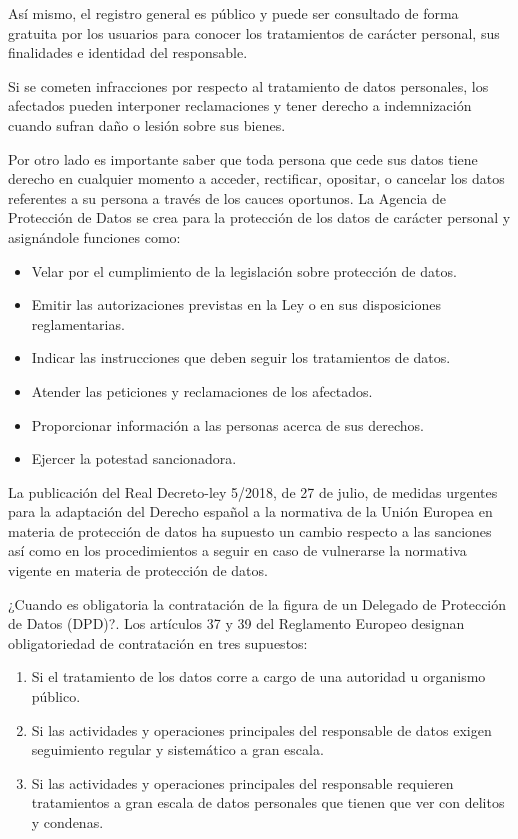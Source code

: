 	\newp Así mismo, el registro general es público y puede ser consultado de forma gratuita por los usuarios para conocer los tratamientos de carácter personal, sus finalidades e identidad del responsable.
	
	\newp Si se cometen infracciones por respecto al tratamiento de datos personales, los afectados pueden interponer reclamaciones y tener derecho a indemnización cuando sufran daño o lesión sobre sus bienes.
	
	\newp Por otro lado es importante saber que toda persona que cede sus datos tiene derecho en cualquier momento a acceder, rectificar, opositar, o cancelar los datos referentes a su persona a través de los cauces oportunos.
\newpage
	\newp La Agencia de Protección de Datos se crea para la protección de los datos de carácter personal y asignándole funciones como:
	\begin{itemize}
		\item Velar por el cumplimiento de la legislación sobre protección de datos.
		\item Emitir las autorizaciones previstas en la Ley o en sus disposiciones reglamentarias.
		\item Indicar las instrucciones que deben seguir los tratamientos de datos.
		\item Atender las peticiones y reclamaciones de los afectados.
		\item Proporcionar información a las personas acerca de sus derechos.
		\item Ejercer la potestad sancionadora.
	\end{itemize}
	
	\newp La publicación del Real Decreto-ley 5/2018, de 27 de julio, de medidas urgentes para la adaptación del Derecho español a la normativa de la Unión Europea en materia de protección de datos ha supuesto un cambio respecto a las sanciones así como en los procedimientos a seguir  en caso de vulnerarse la normativa vigente en materia de protección de datos.
	
	\newp ¿Cuando es obligatoria la contratación de la figura de un Delegado de Protección de Datos (DPD)?. Los artículos 37 y 39 del Reglamento Europeo designan obligatoriedad de contratación en tres supuestos:
	\begin{enumerate}
		\item Si el tratamiento de los datos corre a cargo de una autoridad u organismo público.
		\item Si las actividades y operaciones principales del responsable de datos exigen seguimiento regular y sistemático a gran escala.
		\item Si las actividades y operaciones principales del responsable requieren tratamientos a gran escala de datos personales que tienen que ver con delitos y condenas.
	\end{enumerate}
	

